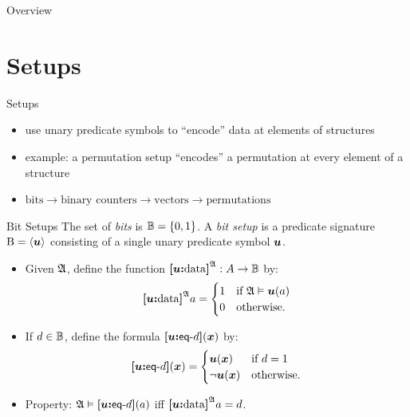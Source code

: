 \documentclass{beamer}
\begin{document}
\begin{frame}{Overview}
\tableofcontents
\end{frame}

\section{Setups}
\begin{frame}{Setups}
\begin{itemize}
  \item
   use unary predicate symbols to ``encode'' data at elements of structures
  
  \item
  example: a permutation setup ``encodes'' a permutation at every
  element of a structure
  
  \item
  $\text{bits} \to \text{binary counters} \to \text{vectors} \to
  \text{permutations}$
\end{itemize}
\end{frame}

\begin{frame}{Bit Setups}
The set of \emph{bits} is $\mathbb{B} = \left\{0,1\right\}$.
A \emph{bit setup} is a predicate signature ${\mathrm{B}} = \left\langle \bm{u} \right\rangle$ consisting of a
single unary predicate symbol $\bm{u}$.
\begin{itemize}
  \item Given $\mathfrak{A}$, define the function ${\bm{[}\bm{u}\mathord{\bm{:}}\mathrm{data}\bm{]}}^{\mathfrak{A}} :
  A\to\mathbb{B}$ by:
  \[
    {\bm{[}\bm{u}\mathord{\bm{:}}\mathrm{data}\bm{]}}^{\mathfrak{A}} a = \begin{cases}
      1 &\text{if } \mathfrak{A} \vDash \bm{u}(a) \\
      0 &\text{otherwise.}
    \end{cases}
  \]
  
  \item
  If $d\in\mathbb{B}$, define the formula ${\bm{[}\bm{u}\mathord{\bm{:}}\mathsf{eq}{\hbox{-}}d\bm{]}}(\bm{x})$ by:
  \[
  {\bm{[}\bm{u}\mathord{\bm{:}}\mathsf{eq}{\hbox{-}}d\bm{]}}(\bm{x}) = \begin{cases}
    \bm{u}(\bm{x}) &\text{if } d = 1 \\
    \lnot\bm{u}(\bm{x}) &\text{otherwise.}
  \end{cases}
  \]
  
  \item Property: $\mathfrak{A}\vDash{\bm{[}\bm{u}\mathord{\bm{:}}\mathsf{eq}{\hbox{-}}d\bm{]}}(a)$ iff ${\bm{[}\bm{u}\mathord{\bm{:}}\mathrm{data}\bm{]}}^{\mathfrak{A}}a =
  d$.
\end{itemize}
\end{frame}
\end{document}
